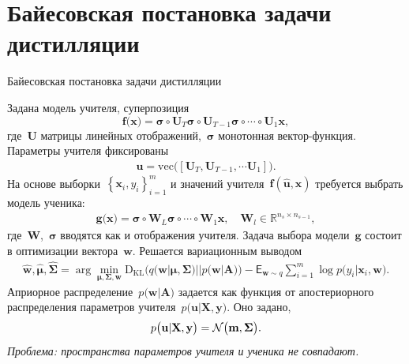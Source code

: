 \documentclass[10pt,pdf,hyperref={unicode}]{beamer}
\begin{document}
\section{Байесовская постановка задачи дистилляции}
\begin{frame}{Байесовская постановка задачи дистилляции}

Задана модель учителя, суперпозиция
\[
\mathbf{f}\bigr(\mathbf{x}\bigr) = \bm{\sigma} \circ \mathbf{U}_T\bm{\sigma} \circ \mathbf{U}_{T-1}\bm{\sigma} \circ \cdots \circ \mathbf{U}_1\mathbf{x},
\]
где~$\mathbf{U}$ матрицы линейных отображений,~$\bm{\sigma}$ монотонная вектор-функция. Параметры учителя фиксированы
\[
\begin{aligned}
\mathbf{u} = \text{vec}\bigr(\left[\mathbf{U}_T, \mathbf{U}_{T-1}, \cdots \mathbf{U}_1\right]\bigr).
\end{aligned}
\]
На основе выборки~$\left\{\mathbf{x}_i, y_i\right\}_{i=1}^{m}$ и значений учителя~$\mathbf{f}(\hat{\mathbf{u}},\mathbf{x})$ требуется выбрать модель ученика:
\[
\begin{aligned}
\mathbf{g}\bigr(\mathbf{x}\bigr) = \bm{\sigma} \circ \mathbf{W}_L\bm{\sigma} \circ \cdots \circ \mathbf{W}_1\mathbf{x}, \quad \mathbf{W}_l \in \mathbb{R}^{n_s \times n_{s-1}},
\end{aligned}
\]
где~$\mathbf{W}$,~$\bm{\sigma}$ вводятся как и отображения учителя. Задача выбора модели~$\mathbf{g}$ состоит в оптимизации вектора~$\mathbf{w}$.  Решается  вариационным выводом
\[
\begin{aligned}
\hat{\mathbf{w}}, \hat{\bm{\mu}}, \hat{\bm{\Sigma}} = \arg \min_{\bm{\mu}, \bm{\Sigma}, \mathbf{w}} \text{D}_{\text{KL}}\bigr(q\bigr(\mathbf{w}|\bm{\mu}, \bm{\Sigma}\bigr)||p\bigr(\mathbf{w}|\mathbf{A}\bigr)\bigr) - \mathsf{E}_{\mathbf{w}\sim q}\sum_{i=1}^{m}\log p\bigr(y_i|\mathbf{x}_{i}, \mathbf{w}\bigr).
\end{aligned}
\]
Априорное распределение~$p\bigr(\mathbf{w}|\mathbf{A}\bigr)$ задается как функция от апостериорного распределения параметров учителя~$p\bigr(\mathbf{u}|\mathbf{X}, \mathbf{y}\bigr)$.  Оно задано,
\[
\setlength\abovedisplayskip{0pt}
\begin{aligned}
p\bigr(\mathbf{u}|\mathbf{X}, \mathbf{y}\bigr) = \mathcal{N}\bigr(\mathbf{m}, \bm{\Sigma}\bigr).
\end{aligned}
\]
{\it \color{red}Проблема: пространства параметров учителя и ученика не совпадают.}
\end{frame}
\end{document}
